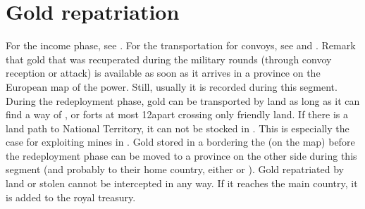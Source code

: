 \section{Gold repatriation}\label{chRedep:GoldRepatriation}

 For the income phase, see
.
\bparag For the transportation for convoys, see
 and .
\bparag Remark that gold that was recuperated during the military rounds
(through convoy reception or attack) is available as soon as it arrives in a
province on the European map of the power. Still, usually it is recorded
during this segment.
\label{chRedep:GoldTransportation} During the
redeployment phase, gold can be transported by land as long as it can find a
way of \TP, \COL or forts at most 12\MP apart crossing only friendly land. If
there is a land path to National Territory, it can not be stocked in \ROTW.
\bparag This is especially the case for \RUS exploiting mines in
.
\bparag Gold stored in a \COL bordering the  (on the \ROTW
map) before the redeployment phase can be moved to a province on the other
side during this segment (and probably to their home country, either \POL or
\TUR).
\bparag Gold repatriated by land or stolen cannot be intercepted in any
way. If it reaches the main country, it is added to the royal treasury.



